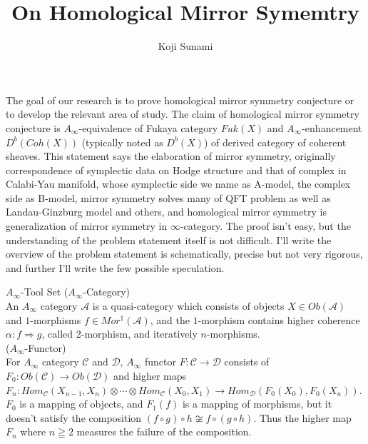 \documentclass{article}
\title{On Homological Mirror Symemtry}
\author{Koji Sunami}
\begin{document}
\maketitle
\vspace{1cm}


The goal of our research is to prove homological mirror symmetry conjecture or to develop the relevant area of study.
The claim of homological mirror symmetry conjecture is $A_\infty$-equivalence of Fukaya category $Fuk(X)$ 
and $A_\infty$-enhancement $D^b(Coh(X))$ (typically noted as $D^b(X)$) of derived category of coherent sheaves.
This statement says the elaboration of mirror symmetry, originally correspondence of symplectic data on Hodge structure and that of complex
in Calabi-Yau manifold, whose symplectic side we name as A-model, the complex side as B-model, 
mirror symmetry solves many of QFT problem as well as Landau-Ginzburg model and others,
and homological mirror symmetry is generalization of mirror symmetry in $\infty$-category. 
The proof isn't easy, but the understanding of the problem statement itself is not difficult. 
I'll write the overview of the problem statement is schematically, precise but not very rigorous,
and further I'll write the few possible speculation. \\


\begin{definition}{$A_\infty$-Tool Set}{}
($A_\infty$-Category) \\
An $A_\infty$ category $\mathcal{A}$ is a quasi-category which consists of objects $X\in Ob(\mathcal{A})$
and $1$-morphisms $f\in Mor^1(\mathcal{A})$, and the $1$-morphism contains higher coherence $\alpha: f\Rightarrow g$, 
called 2-morphism, and iteratively $n$-morphisms. \\

($A_\infty$-Functor) \\
For $A_\infty$ category $\mathcal{C}$ and $\mathcal{D}$, $A_\infty$ functor $F:\mathcal{C}\to \mathcal{D}$ consists of 
$F_0:Ob(\mathcal{C})\to Ob(\mathcal{D})$ and higher maps
$F_n: Hom_\mathcal{C} (X_{n-1}, X_n)  \otimes \cdots \otimes Hom_\mathcal{C} (X_0, X_1) \to Hom_\mathcal{D} (F_0(X_0), F_0(X_n))$. 
$F_0$ is a mapping of objects, and $F_1(f)$ is a mapping of morphisms, but it doesn't satisfy the composition 
$(f\circ g)\circ h\not\cong f\circ (g\circ h)$. Thus the higher map $F_n$ where $n\geqq 2$ measures the failure of the composition.
\end{definition}
\end{document}
